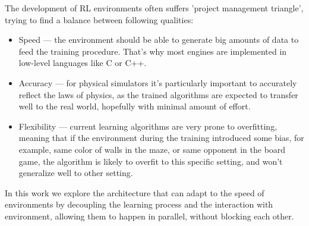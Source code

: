 The development of RL environments often suffers 'project management triangle', trying to
find a balance between following qualities:
\begin{itemize}
    \item Speed --- the environment should be able to generate big amounts of data to
    feed the training procedure. That's why most engines are implemented in low-level
    languages like C or C++.

    \item Accuracy --- for physical simulators it's particularly important to accurately reflect the
    laws of physics, as the trained algorithms are expected to transfer well to the real world,
    hopefully with minimal amount of effort.

    \item Flexibility --- current learning algorithms are very prone to overfitting, meaning that
    if the environment during the training introduced some bias, for example, same color of
    walls in the maze, or same opponent in the board game, the algorithm is likely to overfit
    to this specific setting, and won't generalize well to other setting.
\end{itemize}

In this work we explore the architecture that can adapt to the speed of environments by decoupling
the learning process and the interaction with environment, allowing them to happen in parallel,
without blocking each other.

%
%
